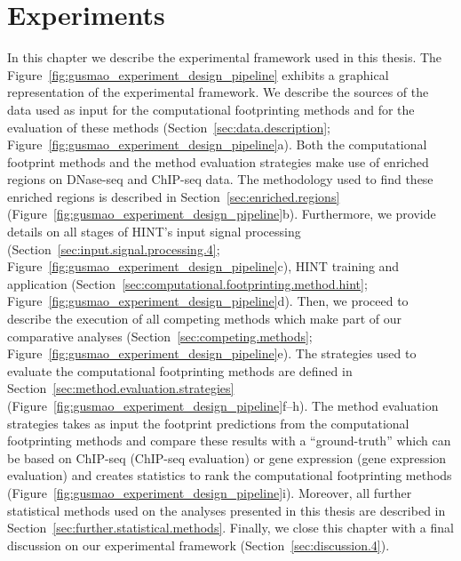 \chapter{Experiments}
\label{cha:experiments}

\graphicspath{{chapter4/figs/}}

In this chapter we describe the experimental framework used in this thesis. The Figure~\ref{fig:gusmao_experiment_design_pipeline} exhibits a graphical representation of the experimental framework. We describe the sources of the data used as input for the computational footprinting methods and for the evaluation of these methods (Section~\ref{sec:data.description}; Figure~\ref{fig:gusmao_experiment_design_pipeline}a). Both the computational footprint methods and the method evaluation strategies make use of enriched regions on DNase-seq and ChIP-seq data. The methodology used to find these enriched regions is described in Section~\ref{sec:enriched.regions} (Figure~\ref{fig:gusmao_experiment_design_pipeline}b). Furthermore, we provide details on all stages of HINT's input signal processing (Section~\ref{sec:input.signal.processing.4}; Figure~\ref{fig:gusmao_experiment_design_pipeline}c), HINT training and application (Section~\ref{sec:computational.footprinting.method.hint}; Figure~\ref{fig:gusmao_experiment_design_pipeline}d). Then, we proceed to describe the execution of all competing methods which make part of our comparative analyses (Section~\ref{sec:competing.methods}; Figure~\ref{fig:gusmao_experiment_design_pipeline}e). The strategies used to evaluate the computational footprinting methods are defined in Section~\ref{sec:method.evaluation.strategies} (Figure~\ref{fig:gusmao_experiment_design_pipeline}f--h). The method evaluation strategies takes as input the footprint predictions from the computational footprinting methods and compare these results with a ``ground-truth'' which can be based on ChIP-seq (ChIP-seq evaluation) or gene expression (gene expression evaluation) and creates statistics to rank the computational footprinting methods (Figure~\ref{fig:gusmao_experiment_design_pipeline}i). Moreover, all further statistical methods used on the analyses presented in this thesis are described in Section~\ref{sec:further.statistical.methods}. Finally, we close this chapter with a final discussion on our experimental framework (Section~\ref{sec:discussion.4}).

